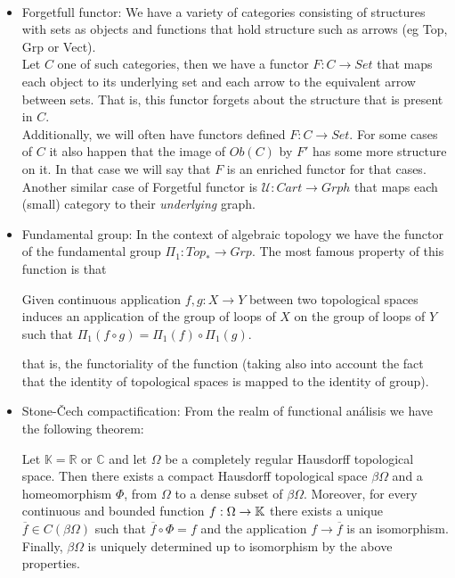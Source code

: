 \begin{example}\ 
  \begin{itemize}
  \item {Forgetfull functor}: We have a variety of categories consisting of structures with sets as objects and functions that hold structure such as arrows (eg Top, Grp or Vect).\\
    
    Let $C$ one of such  categories, then we have a functor $F:C\to Set$ that maps each object to its underlying set and each arrow to the equivalent arrow between sets. That is, this functor forgets about the structure that is present in $C$.\\

    Additionally, we will often have functors defined $F:C\to Set$. For some cases of $C$ it also happen that the image of $Ob(C)$ by $F'$ has some more structure on it. In that case we will say that $F$ is an enriched functor for that cases.\\

    Another similar case of Forgetful functor is $\mathcal{U}:Cart \to Grph$ that maps each (small) category to their \emph{underlying} graph. 
  \item Fundamental group: In the context of algebraic topology we have the functor of the fundamental group $\Pi_1: Top_* \to Grp$. The most famous property of this function is that

    
    \begin{displayquote}
      Given continuous application $ f,g:X \to Y$ between two topological spaces induces an application of the group of loops of $X$ on the group of loops of $Y$ such that $\Pi_1(f \circ g) = \Pi_1(f) \circ \Pi_1(g)$.
    \end{displayquote}

    that is, the functoriality of the function (taking also into account the fact that the identity of topological spaces is mapped to the identity of group). 

  \item Stone-\v{C}ech compactification\label{example:stone-cech}:  From the realm of functional análisis we have the following theorem:

    \begin{theorem} Let $\mathbb{K}=\mathbb R $ or $\mathbb C$ and let $\Omega$ be a completely regular Hausdorff topological space. Then there exists a compact Hausdorff topological space $\beta \Omega$ and a homeomorphism $\Phi$, from $\Omega$ to a dense subset of $\beta\Omega$. Moreover, for every continuous and bounded function $f: \Omega \to \mathbb{K}$ there exists a unique $\overline{f} \in C(\beta \Omega)$ such that $\overline{f}\circ \Phi = f$ and the application $f \to \overline{f}$ is an isomorphism. Finally, $\beta \Omega$ is uniquely determined up to isomorphism by the above properties.
    \end{theorem}


\end{itemize}
\end{example}
